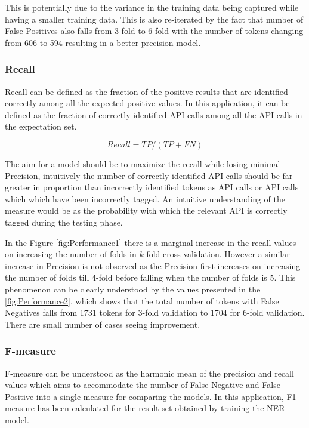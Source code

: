 \documentclass{sig-alternate-05-2015}
\begin{document}
This is potentially due to the variance in the training data being captured while having a smaller training data. This is also re-iterated by the fact that number of False Positives also falls from 3-fold to 6-fold with the number of tokens changing from 606 to 594 resulting in a better precision model.

\subsubsection{Recall}
Recall can be defined as the fraction of the positive results that are identified correctly among all the expected positive values. In this application, it can be defined as the fraction of correctly identified API calls among all the API calls in the expectation set.

\begin{equation}
Recall = TP/(TP+FN)
\end{equation}

The aim for a model should be to maximize the recall while losing minimal Precision, intuitively the number of correctly identified API calls should be far greater in proportion than incorrectly identified tokens as API calls or API calls which which have been incorrectly tagged. An intuitive understanding of the measure would be as the probability with which the relevant API is correctly tagged during the testing phase.

In the Figure \ref{fig:Performance1} there is a marginal increase in the recall values on increasing the number of folds in $k$-fold cross validation. However a similar increase in Precision is not observed as the Precision first increases on increasing the number of folds till 4-fold before falling when the number of folds is 5. This phenomenon can be clearly understood by the values presented in the \ref{fig:Performance2}, which shows that the total number of tokens with False Negatives falls from 1731 tokens for 3-fold validation to 1704 for 6-fold validation. There are small number of cases seeing improvement.


\subsubsection{F-measure}
F-measure can be understood as the harmonic mean of the precision and recall values which aims to accommodate the number of False Negative and False Positive into a single measure for comparing the models. In this application, F1 measure has been calculated for the result set obtained by training the NER model.
\end{document}
